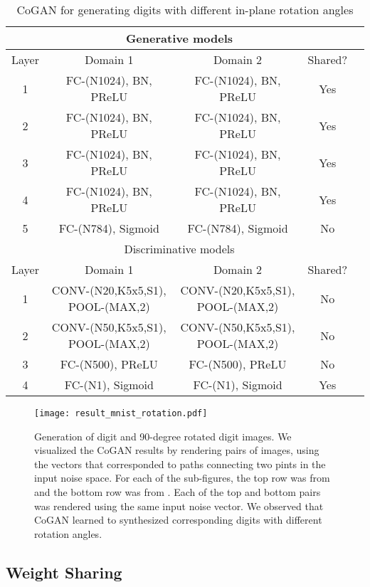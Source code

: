 \documentclass{article}
\begin{document}
\begin{table*}[thb!]
\small
\centering
{
\caption{CoGAN for generating digits with different in-plane rotation angles}
\label{tbl::mnist_rotation}
\begin{tabular}{|c|c|c|c|c|}
\hline
\multicolumn{4}{|c|}{Generative models}\\
\hline\rule{0pt}{2ex}    
Layer &  Domain 1 & Domain 2 & Shared? \\
\hline 
1 &  FC-(N1024), BN, PReLU & FC-(N1024), BN, PReLU & Yes\\
2 &  FC-(N1024), BN, PReLU & FC-(N1024), BN, PReLU &Yes\\
3 &  FC-(N1024), BN, PReLU & FC-(N1024), BN, PReLU &Yes\\
4 &  FC-(N1024), BN, PReLU & FC-(N1024), BN, PReLU &Yes\\
5 &  FC-(N784), Sigmoid & FC-(N784), Sigmoid & No\\
\hline
\hline
\multicolumn{4}{|c|}{Discriminative models}\\
\hline\rule{0pt}{2ex} 
Layer &  Domain 1 & Domain 2 & Shared? \\
\hline
1 & CONV-(N20,K5x5,S1), POOL-(MAX,2) & CONV-(N20,K5x5,S1), POOL-(MAX,2) &No\\
2 & CONV-(N50,K5x5,S1), POOL-(MAX,2) & CONV-(N50,K5x5,S1), POOL-(MAX,2) &No\\
3 & FC-(N500), PReLU & FC-(N500), PReLU &No\\
4 & FC-(N1), Sigmoid & FC-(N1), Sigmoid &Yes\\
\hline
\end{tabular}
}
\end{table*}
\begin{figure}[thb!]
\centering
\texttt{[image: result\_mnist\_rotation.pdf]}
\caption{Generation of digit and 90-degree rotated digit images. We visualized the CoGAN results by rendering pairs of images, using the vectors that corresponded to paths connecting two pints in the input noise space. For each of the sub-figures, the top row was from  and the bottom row was from . Each of the top and bottom pairs was rendered using the same input noise vector. We observed that CoGAN learned to synthesized corresponding digits with different rotation angles.}
\label{fig::result_mnist_rotation}
\end{figure}

\subsection{Weight Sharing}\label{subsec::sharing}
\end{document}
